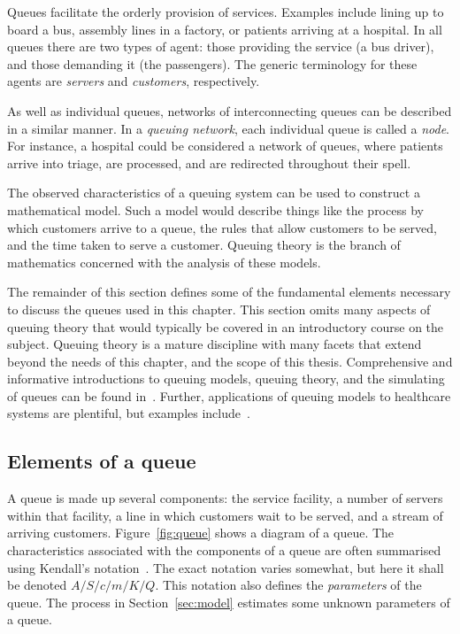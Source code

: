 Queues facilitate the orderly provision of services. Examples include lining up
to board a bus, assembly lines in a factory, or patients arriving at a hospital.
In all queues there are two types of agent: those providing the
service (a bus driver), and those demanding it (the passengers). The generic
terminology for these agents are \emph{servers} and \emph{customers},
respectively.

As well as individual queues, networks of interconnecting queues can be
described in a similar manner. In a \emph{queuing network}, each individual
queue is called a \emph{node}. For instance, a hospital could be considered a
network of queues, where patients arrive into triage, are processed, and are
redirected throughout their spell.

The observed characteristics of a queuing system can be used to construct a
mathematical model. Such a model would describe things like the process by which
customers arrive to a queue, the rules that allow customers to be served, and
the time taken to serve a customer. Queuing theory is the branch of mathematics
concerned with the analysis of these models.

The remainder of this section defines some of the fundamental elements necessary
to discuss the queues used in this chapter. This section omits many aspects of
queuing theory that would typically be covered in an introductory course on the
subject. Queuing theory is a mature discipline with many facets that extend
beyond the needs of this chapter, and the scope of this thesis. Comprehensive
and informative introductions to queuing models, queuing theory, and the
simulating of queues can be found in~\cite{Bhat2015,Shortle2018,Stewart2009}.
Further, applications of queuing models to healthcare systems are plentiful, but
examples include~\cite{%
    Bittencourt2018,Cochran2009,Mohammadi2012,Steins2013,Williams2015,Yom2014%
}.

\subsection{Elements of a queue}\label{subsec:elements}

A queue is made up several components: the service facility, a number of servers
within that facility, a line in which customers wait to be served, and a stream
of arriving customers. Figure~\ref{fig:queue} shows a diagram of a queue. The
characteristics associated with the components of a queue are often summarised
using Kendall's notation~\cite{Stewart2009}. The exact notation varies somewhat,
but here it shall be denoted \(A/S/c/m/K/Q\). This notation also defines the
\emph{parameters} of the queue. The process in Section~\ref{sec:model} estimates
some unknown parameters of a queue.

